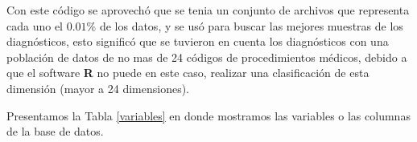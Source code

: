   
  
  Con este código se aprovechó que se tenia un conjunto de archivos que representa cada uno el $0.01\%$ de los datos, y se usó para buscar las mejores muestras de los diagnósticos, esto significó que se tuvieron en cuenta los diagnósticos con una población de datos de no mas de 24 códigos de procedimientos médicos, debido a que el software \textbf{R} no puede en este caso, realizar una clasificación de esta dimensión (mayor a 24 dimensiones).
 
 Presentamos la Tabla \ref{variables} en donde mostramos las variables o las columnas de la base de datos.
 
